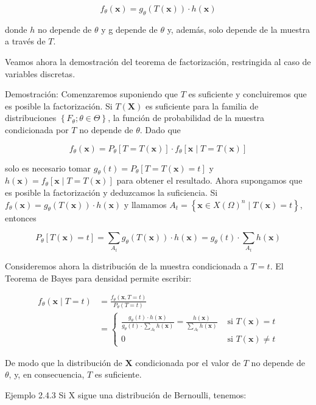 \documentclass[
]{article}
\begin{document}
\[
f_{\theta}(\mathbf{x})=g_{\theta}(T(\mathbf{x})) \cdot h(\mathbf{x})
\]

donde \(h\) no depende de \(\theta\) y g depende de \(\theta\) y, además, solo depende de la muestra a través de \(T\).

Veamos ahora la demostración del teorema de factorización, restringida al caso de variables discretas.

Demostración:
Comenzaremos suponiendo que \(T\) es suficiente y concluiremos que es posible la factorización.
Si \(T(\mathbf{X})\) es suficiente para la familia de distribuciones \(\left\{F_{\theta} ; \theta \in \Theta\right\}\), la función de probabilidad de la muestra condicionada por \(T\) no depende de \(\theta\). Dado que

\[
f_{\theta}(\mathbf{x})=P_{\theta}[T=T(\mathbf{x})] \cdot f_{\theta}[\mathbf{x} \mid T=T(\mathbf{x})]
\]

solo es necesario tomar \(g_{\theta}(t)=P_{\theta}[T=T(\mathbf{x})=t]\) y \(h(\mathbf{x})=f_{\theta}[\mathbf{x} \mid T=T(\mathbf{x})]\) para obtener el resultado.
Ahora supongamos que es posible la factorización y deduzcamos la suficiencia.
Si \(f_{\theta}(\mathbf{x})=g_{\theta}(T(\mathbf{x})) \cdot h(\mathbf{x})\) y llamamos \(A_{t}=\left\{\mathbf{x} \in X(\Omega)^{n} \mid T(\mathbf{x})=t\right\}\), entonces

\[
P_{\theta}[T(\mathbf{x})=t]=\sum_{A_{t}} g_{\theta}(T(\mathbf{x})) \cdot h(\mathbf{x})=g_{\theta}(t) \cdot \sum_{A_{t}} h(\mathbf{x})
\]

Consideremos ahora la distribución de la muestra condicionada a \(T=t\). El Teorema de Bayes para densidad permite escribir:

\[
\begin{aligned}
f_{\theta}(\mathbf{x} \mid T=t) & =\frac{f_{\theta}(\mathbf{x}, T=t)}{P_{\theta}(T=t)} \\
& = \begin{cases}\frac{g_{\theta}(t) \cdot h(\mathbf{x})}{g_{\theta}(t) \cdot \sum_{A_{t}} h(\mathbf{x})}=\frac{h(\mathbf{x})}{\sum_{A_{t}} h(\mathbf{x})} & \text { si } T(\mathbf{x})=t \\
0 & \text { si } T(\mathbf{x}) \neq t\end{cases}
\end{aligned}
\]

De modo que la distribución de \(\mathbf{X}\) condicionada por el valor de \(T\) no depende de \(\theta\), y, en consecuencia, \(T\) es suficiente.

Ejemplo 2.4.3 Si X sigue una distribución de Bernoulli, tenemos:
\end{document}
